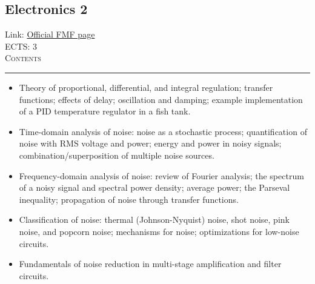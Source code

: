 \documentclass[11pt, a4paper]{article}
\newenvironment{course}[3]{
\subsection{#1}%
Link: \href{#2}{Official FMF page}\\%
ECTS: #3%
\vspace{1ex}
\\
{\large \textsc{Contents}}\\[-0.9ex]%
\rule{\textwidth}{0.5pt}
\vspace{-3ex}
}
{}
\newenvironment{chapter}[1]{
\begin{tcolorbox}[title=#1, breakable]
}
{\end{tcolorbox}}
\begin{document}
\begin{course}{Electronics 2}{https://www.fmf.uni-lj.si/en/study-physics/programmes/1fiz/2020/7000777/courses/1135/}{3}
\begin{chapter}{Fundamentals of electronic regulation}
\begin{itemize}
            \item Theory of proportional, differential, and integral regulation; transfer functions; effects of delay; oscillation and damping; example implementation of a PID temperature regulator in a fish tank.
        
        \end{itemize}
    \end{chapter}

    \begin{chapter}{Fundamentals of noise}
        \begin{itemize}
        
            \item Time-domain analysis of noise: noise as a stochastic process; quantification of noise with RMS voltage and power; energy and power in noisy signals; combination/superposition of multiple noise sources.

            \item Frequency-domain analysis of noise: review of Fourier analysis; the spectrum of a noisy signal and spectral power density; average power; the Parseval inequality; propagation of noise through transfer functions.

            \item Classification of noise: thermal (Johnson-Nyquist) noise, shot noise, pink noise, and popcorn noise; mechanisms for noise; optimizations for low-noise circuits.

            \item Fundamentals of noise reduction in multi-stage amplification and filter circuits.
        
        \end{itemize}
    \end{chapter}

\end{course}
\end{document}
